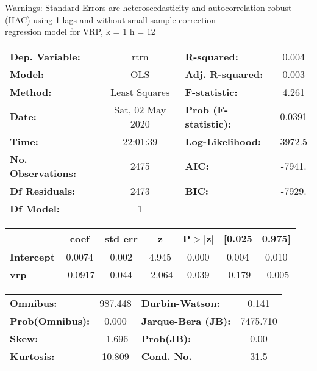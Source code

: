 Warnings: \newline
 [1] Standard Errors are heteroscedasticity and autocorrelation robust (HAC) using 1 lags and without small sample correction\\ 

regression model for VRP, k = 1 h = 12\begin{center}
\begin{tabular}{lclc}
\toprule
\textbf{Dep. Variable:}    &       rtrn       & \textbf{  R-squared:         } &     0.004   \\
\textbf{Model:}            &       OLS        & \textbf{  Adj. R-squared:    } &     0.003   \\
\textbf{Method:}           &  Least Squares   & \textbf{  F-statistic:       } &     4.261   \\
\textbf{Date:}             & Sat, 02 May 2020 & \textbf{  Prob (F-statistic):} &   0.0391    \\
\textbf{Time:}             &     22:01:39     & \textbf{  Log-Likelihood:    } &    3972.5   \\
\textbf{No. Observations:} &        2475      & \textbf{  AIC:               } &    -7941.   \\
\textbf{Df Residuals:}     &        2473      & \textbf{  BIC:               } &    -7929.   \\
\textbf{Df Model:}         &           1      & \textbf{                     } &             \\
\bottomrule
\end{tabular}
\begin{tabular}{lcccccc}
                   & \textbf{coef} & \textbf{std err} & \textbf{z} & \textbf{P$> |$z$|$} & \textbf{[0.025} & \textbf{0.975]}  \\
\midrule
\textbf{Intercept} &       0.0074  &        0.002     &     4.945  &         0.000        &        0.004    &        0.010     \\
\textbf{vrp}       &      -0.0917  &        0.044     &    -2.064  &         0.039        &       -0.179    &       -0.005     \\
\bottomrule
\end{tabular}
\begin{tabular}{lclc}
\textbf{Omnibus:}       & 987.448 & \textbf{  Durbin-Watson:     } &    0.141  \\
\textbf{Prob(Omnibus):} &   0.000 & \textbf{  Jarque-Bera (JB):  } & 7475.710  \\
\textbf{Skew:}          &  -1.696 & \textbf{  Prob(JB):          } &     0.00  \\
\textbf{Kurtosis:}      &  10.809 & \textbf{  Cond. No.          } &     31.5  \\
\bottomrule
\end{tabular}
\end{center}

